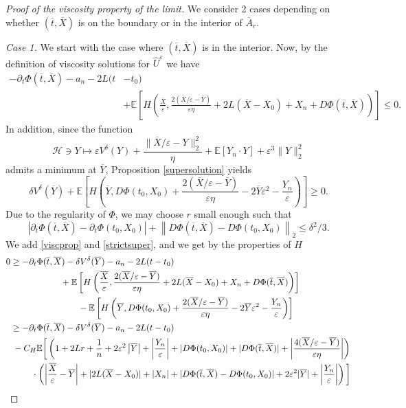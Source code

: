 \documentclass[reqno,11pt]{amsart}
\numberwithin{equation}{section}
\newcommand{\be}{\begin{equation}}
\newcommand{\ee}{\end{equation}}
\newcommand{\e}{\varepsilon}
\newcommand{\nd}{\noindent}
\renewcommand{\hat}{\widehat}
\begin{document}
\begin{proof}[Proof of the viscosity property of the limit]
    \nd
    We consider 2 cases depending on whether $(\overline{t},\overline{X})$ is on the boundary or in the interior of $\overline{A}_r$.
    \vspace{3mm}

    \nd
    \textit{Case 1.} We start with the case where $(\overline{t},\overline{X})$ is in the interior. Now, by the definition of viscosity solutions for $\hat{U}^\e$ we have
    \be\label{viscprop}
    \begin{split}
    -\partial_t\Phi(\overline{t},\overline{X})-a_n-2L(t&-t_0)\\
    &+\mathbb{E}\left[ H\left( \frac{\overline{X}}{\e}, \frac{2 (\overline{X}/\e-\overline{Y})}{\e\eta}+2L(\overline{X}-X_0)+X_n+D\Phi(\overline{t},\overline{X})    \right)\right]\le 0.
    \end{split}
    \ee
    In addition, since the function
    $$\mathcal{H}\ni Y\mapsto \e V^\delta(Y)+\frac{\|\overline{X}/\e-Y\|_2^2}{\eta}+\mathbb{E}[Y_n\cdot Y]+\e^3\|Y\|_2^2$$
    admits a minimum at $\overline{Y}$, Proposition \ref{supersolution} yields
    \be\label{strictsuper}
    \delta V^\delta(\overline{Y})+\mathbb{E}\left[ H\left(\overline{Y},D\Phi(t_0,X_0)+\frac{2(\overline{X}/\e-\overline{Y})}{\e\eta} -2\overline{Y}\e^2 -\frac{Y_n}{\e} \right)   \right]\ge 0.
    \ee
    Due to the regularity of $\Phi$, we may choose $r$ small enough such that
    \be\label{prox3}
    \left|\partial_t\Phi(\overline{t},\overline{X})-\partial_t\Phi(t_0,X_0)\right|+\left\|D\Phi(\overline{t},\overline{X})-D\Phi(t_0,X_0)\right\|_2\le \delta^2/3.
    \ee
    We add \eqref{viscprop} and \eqref{strictsuper}, and we get by the properties of $H$
    \begin{align}
    0&\ge -\partial_t\Phi(\overline{t},\overline{X})-\delta V^\delta(\overline{Y})-a_n-2L(t-t_0)\nonumber\\
    &\hspace{2cm}+\mathbb{E}\left[ H\left( \frac{\overline{X}}{\e}, \frac{2 (\overline{X}/\e-\overline{Y})}{\e\eta}+2L(\overline{X}-X_0)+X_n+D\Phi(\overline{t},\overline{X})    \right)\right]\nonumber\\
    &\hspace{2cm}\qquad -\mathbb{E}\left[ H\left(\overline{Y},D\Phi(t_0,X_0)+\frac{2(\overline{X}/\e-\overline{Y})}{\e\eta} -2\overline{Y}\e^2 -\frac{Y_n}{\e} \right)   \right]\nonumber\\
    &\ge -\partial_t\Phi(\overline{t},\overline{X})-\delta V^\delta(\overline{Y})-a_n-2L(t-t_0)\nonumber\\
    &\; -C_H\mathbb{E}\bigg[\left(1+2Lr+\frac{1}{n}+2\e^2\left|\overline{Y}\right|+\left|\frac{Y_n}{\e}\right|+|D\Phi(t_0,X_0)|+|D\Phi(\overline{t},\overline{X})|+\left|\frac{4(\overline{X}/\e-\overline{Y})}{\e\eta}\right|\right)\nonumber\\
    &\quad\hspace{0.5cm} \cdot \left( \left|\frac{\overline{X}}{\e}-\overline{Y}\right|+|2L(\overline{X}-X_0)|+|X_n|+|D\Phi(\overline{t},\overline{X})-D\Phi(t_0,X_{0})|+2\e^2|\overline{Y}|+\left|\frac{Y_n}{\e}\right|\right)\bigg]\nonumber
    \end{align}


\end{proof}
\end{document}
